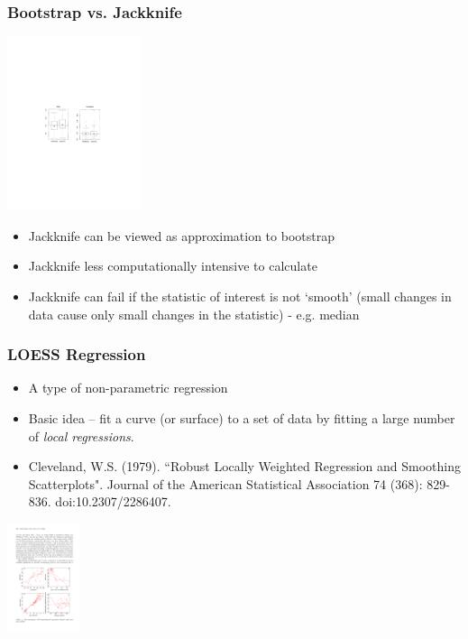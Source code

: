 \documentclass{beamer}
\begin{document}
\begin{frame}
  \frametitle{Bootstrap vs. Jackknife}

\begin{center}
\includegraphics[height=2in]{jack-vs-boot}
\end{center}

\begin{itemize}
    \item Jackknife can be viewed as approximation to bootstrap
    \item Jackknife less computationally intensive to calculate
    \item Jackknife can fail if the statistic of interest is not `smooth' (small changes in data cause only small changes in the statistic) - e.g. median
\end{itemize}

\end{frame}

\begin{frame}
  \frametitle{LOESS Regression}

\begin{itemize}
    \item A type of non-parametric regression
    \item Basic idea -- fit a curve (or surface) to a set of data by fitting a large number of \emph{local regressions}.
    \item Cleveland, W.S. (1979). ``Robust Locally Weighted Regression and Smoothing Scatterplots". Journal of the American Statistical Association 74 (368): 829-836. doi:10.2307/2286407.
\end{itemize}

\begin{center}
\includegraphics[height=1.25in]{loess-example.pdf}
\end{center}


\end{frame}
\end{document}
